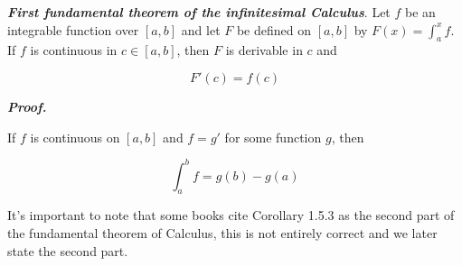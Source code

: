 \documentclass{report}
\begin{document}

    \begin{thBox}
        \textit{\textbf{First fundamental theorem of the infinitesimal Calculus}}. Let $f$ be an integrable function over $[a,b]$ and let $F$ be defined on $[a,b]$ by $F(x) = \int_{a}^{x}f$.\\
        If $f$ is continuous in $c \in [a,b]$, then $F$ is derivable in $c$ and

        $$F'(c) = f(c)$$
    \end{thBox}

    \textit{\textbf{Proof.}}

    \begin{corBox}
        If $f$ is continuous on $[a,b]$ and $f = g'$ for some function $g$, then

        $$\int_{a}^{b}f = g(b) - g(a)$$
    \end{corBox}

    \begin{noteBox}
        It's important to note that some books cite Corollary 1.5.3 as the second part of the fundamental theorem of Calculus, this is not entirely correct and we later state the second part.
    \end{noteBox}
\end{document}
